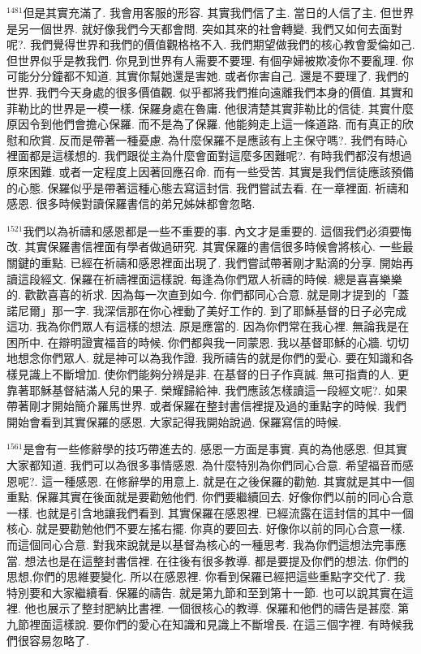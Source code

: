 \documentclass{book}
\begin{document}
$^{1481}$但是其實充滿了.
我會用客服的形容.
其實我們信了主.
當日的人信了主.
但世界是另一個世界.
就好像我們今天都會問.
突如其來的社會轉變.
我們又如何去面對呢?.
我們覺得世界和我們的價值觀格格不入.
我們期望做我們的核心教會愛倫如己.
但世界似乎是教我們.
你見到世界有人需要不要理.
有個孕婦被欺凌你不要亂理.
你可能分分鐘都不知道.
其實你幫她還是害她.
或者你害自己.
還是不要理了.
我們的世界.
我們今天身處的很多價值觀.
似乎都將我們推向遠離我們本身的價值.
其實和菲勒比的世界是一模一樣.
保羅身處在魯庸.
他很清楚其實菲勒比的信徒.
其實什麼原因令到他們會擔心保羅.
而不是為了保羅.
他能夠走上這一條道路.
而有真正的欣慰和欣賞.
反而是帶著一種憂慮.
為什麼保羅不是應該有上主保守嗎?.
我們有時心裡面都是這樣想的.
我們跟從主為什麼會面對這麼多困難呢?.
有時我們都沒有想過原來困難.
或者一定程度上因著回應召命.
而有一些受苦.
其實是我們信徒應該預備的心態.
保羅似乎是帶著這種心態去寫這封信.
我們嘗試去看.
在一章裡面.
祈禱和感恩.
很多時候對讀保羅書信的弟兄姊妹都會忽略.

$^{1521}$我們以為祈禱和感恩都是一些不重要的事.
內文才是重要的.
這個我們必須要悔改.
其實保羅書信裡面有學者做過研究.
其實保羅的書信很多時候會將核心.
一些最關鍵的重點.
已經在祈禱和感恩裡面出現了.
我們嘗試帶著剛才點滴的分享.
開始再讀這段經文.
保羅在祈禱裡面這樣說.
每逢為你們眾人祈禱的時候.
總是喜喜樂樂的.
歡歡喜喜的祈求.
因為每一次直到如今.
你們都同心合意.
就是剛才提到的「蓋諾尼爾」那一字.
我深信那在你心裡動了美好工作的.
到了耶穌基督的日子必完成這功.
我為你們眾人有這樣的想法.
原是應當的.
因為你們常在我心裡.
無論我是在困所中.
在辯明證實福音的時候.
你們都與我一同蒙恩.
我以基督耶穌的心牆.
切切地想念你們眾人.
就是神可以為我作證.
我所禱告的就是你們的愛心.
要在知識和各樣見識上不斷增加.
使你們能夠分辨是非.
在基督的日子作真誠.
無可指責的人.
更靠著耶穌基督結滿人兒的果子.
榮耀歸給神.
我們應該怎樣讀這一段經文呢?.
如果帶著剛才開始簡介羅馬世界.
或者保羅在整封書信裡提及過的重點字的時候.
我們開始會看到其實保羅的感恩.
大家記得我開始說過.
保羅寫信的時候.

$^{1561}$是會有一些修辭學的技巧帶進去的.
感恩一方面是事實.
真的為他感恩.
但其實大家都知道.
我們可以為很多事情感恩.
為什麼特別為你們同心合意.
希望福音而感恩呢?.
這一種感恩.
在修辭學的用意上.
就是在之後保羅的勸勉.
其實就是其中一個重點.
保羅其實在後面就是要勸勉他們.
你們要繼續回去.
好像你們以前的同心合意一樣.
也就是引含地讓我們看到.
其實保羅在感恩裡.
已經流露在這封信的其中一個核心.
就是要勸勉他們不要左搖右擺.
你真的要回去.
好像你以前的同心合意一樣.
而這個同心合意.
對我來說就是以基督為核心的一種思考.
我為你們這想法完事應當.
想法也是在這整封書信裡.
在往後有很多教導.
都是要提及你們的想法.
你們的思想,你們的思維要變化.
所以在感恩裡.
你看到保羅已經把這些重點字交代了.
我特別要和大家繼續看.
保羅的禱告.
就是第九節和至到第十一節.
也可以說其實在這裡.
他也展示了整封肥納比書裡.
一個很核心的教導.
保羅和他們的禱告是甚麼.
第九節裡面這樣說.
要你們的愛心在知識和見識上不斷增長.
在這三個字裡.
有時候我們很容易忽略了.
\end{document}

